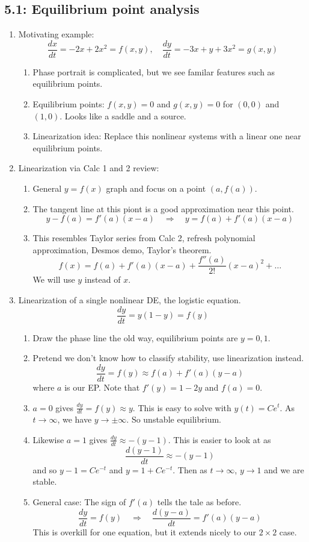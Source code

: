 \documentclass{article}
\begin{document}
\subsection{5.1: Equilibrium point analysis}
\begin{enumerate}
\item Motivating example:
\[
\frac{dx}{dt} = -2x+2x^2=f(x,y), \quad \frac{dy}{dt}=-3x+y+3x^2=g(x,y)
\]
\begin{enumerate}
\item Phase portrait is complicated, but we see familar features such as equilibrium points.
\item Equilibrium points: $f(x,y)=0$ and $g(x,y)=0$ for $(0,0)$ and $(1,0)$. Looks like a saddle and a source.
\item Linearization idea: Replace this nonlinear systems with a linear one near equilibrium points.
\end{enumerate}

\item Linearization via Calc 1 and 2 review:
\begin{enumerate}
\item General $y=f(x)$ graph and focus on a point $(a,f(a))$.
\item The tangent line at this piont is a good approximation near this point.
\[
y-f(a)=f'(a)(x-a) \quad \Rightarrow \quad y=f(a)+f'(a)(x-a)
\]
\item This resembles Taylor series from Calc 2, refresh polynomial approximation, Desmos demo, Taylor's theorem.
\[
f(x) = f(a)+f'(a)(x-a) + \frac{f''(a)}{2!}(x-a)^2+\dots
\]
We will use $y$ instead of $x$.
\end{enumerate}

\item Linearization of a single nonlinear DE, the logistic equation.
\[
\frac{dy}{dt} = y(1-y)=f(y)
\]
\begin{enumerate}
\item Draw the phase line the old way, equilibrium points are $y=0,1$.
\item Pretend we don't know how to classify stability, use linearization instead.
\[
\frac{dy}{dt} = f(y) \approx f(a)+f'(a)(y-a)
\]
where $a$ is our EP. Note that $f'(y)=1-2y$ and $f(a)=0$.
\item $a=0$ gives $\frac{dy}{dt} = f(y) \approx y$. This is easy to solve with $y(t)=Ce^t$. As $t\rightarrow \infty$, we have $y\rightarrow \pm \infty$. So unstable equilibrium.
\item Likewise $a=1$ gives $\frac{dy}{dt} \approx -(y-1)$. This is easier to look at as
\[
\frac{d(y-1)}{dt} \approx -(y-1)
\]
and so $y-1 = Ce^{-t}$ and $y=1+Ce^{-t}$. Then as $t \rightarrow \infty$, $y\rightarrow 1$ and we are stable.
\item General case: The sign of $f'(a)$ tells the tale as before.
\[
\frac{dy}{dt} = f(y) \quad \Rightarrow \quad \frac{d(y-a)}{dt} = f'(a)(y-a)
\] This is overkill for one equation, but it extends nicely to our $2 \times 2$ case.
\end{enumerate}


\end{enumerate}
\end{document}
